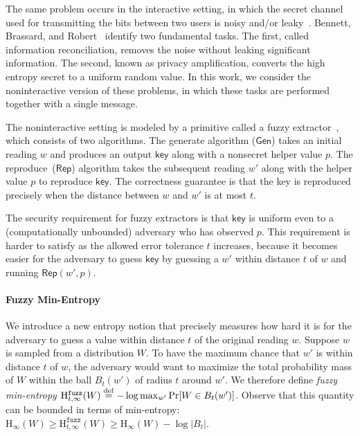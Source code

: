 \documentclass[11pt]{article}
\newcommand{\class}[1]{{\ensuremath{\mathsf{#1}}}}
\newcommand{\key}{\ensuremath{\class{key}}\xspace}
\newcommand{\gen}{\ensuremath{\class{Gen}}\xspace}
\newcommand{\rep}{\ensuremath{\class{Rep}}\xspace}
\newcommand{\eqdef}{\stackrel{\rm def}{=}}
\newcommand{\Hoo}{\mathrm{H}_\infty}
\newcommand{\Hfuzz}{\mathrm{H}^{\mathtt{fuzz}}_{t,\infty}}
\begin{document}
The same problem occurs in the interactive setting, in which the secret channel used for transmitting the bits between two users is noisy and/or leaky~\cite{wyner1975wire}. Bennett, Brassard, and Robert~\cite{bennett1988privacy} identify two fundamental tasks.  The first, called information reconciliation, removes the noise without leaking significant information. The second, known as privacy amplification, converts the high entropy secret to a uniform random value.  In this work, we consider the noninteractive version of these problems, in which these tasks are performed together with a single message.

The noninteractive setting is modeled by a primitive called a fuzzy extractor~\cite{DBLP:journals/siamcomp/DodisORS08}, which consists of two algorithms.  %
The  generate algorithm ($\gen$)  takes an initial reading $w$ and produces an output $\key$ along with a nonsecret helper value $p$.  The reproduce~($\rep$) algorithm takes the subsequent reading $w'$ along with the helper value $p$ to reproduce $\key$.   The correctness guarantee is that the key is reproduced precisely when the distance between $w$ and $w'$ is at most $t$. 

The security requirement for fuzzy extractors is that $\key$ is uniform even to a (computationally unbounded) adversary who has observed $p$.   This requirement is  harder to satisfy as the allowed error tolerance $t$ increases, because it becomes easier for the adversary to guess $\key$ by guessing a $w'$ within distance $t$ of $w$ and running $\rep(w',p)$.


\paragraph{Fuzzy Min-Entropy}
We introduce a new entropy notion that precisely measures how hard it
is for the adversary to guess a value within distance $t$ of the
original reading $w$. 
Suppose $w$ is sampled from a distribution $W$.   To have the maximum chance that $w'$ is within distance $t$ of $w$, the adversary would want to maximize the total probability mass of $W$ within the ball $B_t(w')$ of radius $t$ around $w'$.
We  therefore define \emph{fuzzy min-entropy} $\Hfuzz(W) \eqdef -\log \max_{w'} \Pr[W\in B_t(w')]$.  Observe that this quantity can be bounded in terms of min-entropy: $\Hoo(W) \ge \Hfuzz(W) \ge \Hoo(W)-\log |B_t|$.
\end{document}
